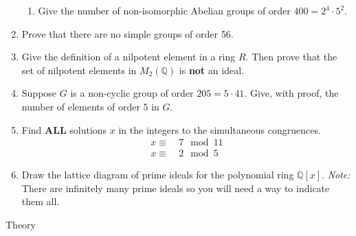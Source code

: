 \documentclass{report}
\newcommand\Q{{\mathbb Q}}
\begin{document}
\begin{enumerate}
\begin{enumerate}
\item  Give the number of non-isomorphic Abelian groups of order $400 = 2^4 \cdot 5^2$.

\end{enumerate}

\item Prove that there are no simple groups of order 56.

\item Give the definition of a nilpotent element in a ring $R$.  Then
prove that the set of nilpotent elements in $M_2(\Q)$ is {\bf not} an ideal.

\item  Suppose $G$ is a non-cyclic group of order $205 = 5\cdot 41$.  Give, with proof, the number
of elements of order $5$ in $G$.

\item 
Find {\bf ALL} solutions $x$ in the integers to the simultaneous congruences. 
\begin{align*}
x \equiv \ &7 \mod{11}\\
x \equiv \ &2 \mod{5}
\end{align*}

\item Draw the lattice diagram of prime ideals for the polynomial ring $\Q[x]$.  \emph{Note:}  There are infinitely many prime ideals so you 
will need a way to indicate them all.

\end{enumerate}

\vskip 1cm

  Theory
\end{document}
